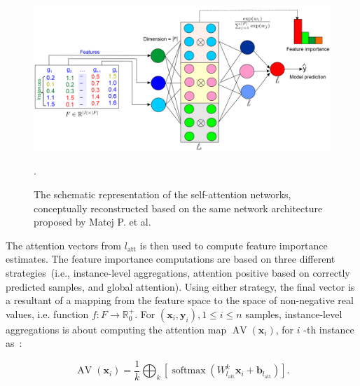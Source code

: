 \begin{figure}
	\centering
	\includegraphics[scale=0.6]{images/san.png}	
	\caption[The schematic representation of the self-attention networks]{The schematic representation of the self-attention networks, conceptually reconstructed based on the same network architecture proposed by Matej P. et al.~\cite{vskrlj2020feature}}.
	\label{fig:san}
\end{figure}

\hspace*{3.5mm} The attention vectors from $l_{\text {att}}$ is then used to compute feature importance estimates. The feature importance computations are based on three different strategies~(i.e., instance-level aggregations, attention positive based on correctly predicted samples, and global attention). Using either strategy,  the final vector is a resultant of a mapping from the feature space to the space of non-negative real values, i.e. function $f: F \rightarrow \mathbb{R}_{0}^{+}$. 
For $\left(\boldsymbol{x}_{i}, \boldsymbol{y}_{i}\right), 1 \leq i \leq n$ samples, instance-level aggregations is about computing the attention map $\operatorname{AV}\left(\boldsymbol{x}_{i}\right)$, for $i$ -th instance as~\cite{vskrlj2020feature}: 

\begin{equation}
    \operatorname{AV}\left(\boldsymbol{x}_{i}\right)=\frac{1}{k} \bigoplus_{k}\left[\operatorname{softmax}\left(W_{l_{\mathrm{att}}}^{k} \boldsymbol{x}_{i}+\boldsymbol{b}_{l_{\mathrm{att}}}\right)\right].
\end{equation}

